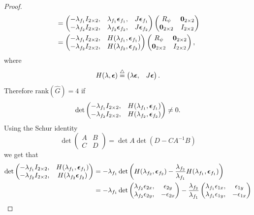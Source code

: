\begin{proof}
\begin{align*}
	&= \begin{pmatrix} -\lambda_{f_1} I_{2\times 2}, & \lambda_{f_1} \boldsymbol{\epsilon}_{f_1}, & J\boldsymbol{\epsilon}_{f_1} \\ -\lambda_{f_2} I_{2\times 2}, & \lambda_{f_2} \boldsymbol{\epsilon}_{f_2}, & J\boldsymbol{\epsilon}_{f_2} \end{pmatrix} \begin{pmatrix}R_\psi & \mathbf{0}_{2\times 2} \\ \mathbf{0}_{2\times 2} & I_{2\times 2}\end{pmatrix} \\
	&= \begin{pmatrix} -\lambda_{f_1} I_{2\times 2}, & H(\lambda_{f_1}, \boldsymbol{\epsilon}_{f_1}) \\ -\lambda_{f_2} I_{2\times 2}, & H(\lambda_{f_2}, \boldsymbol{\epsilon}_{f_2}) \end{pmatrix} \begin{pmatrix}R_\psi & \mathbf{0}_{2\times 2} \\ \mathbf{0}_{2\times 2} & I_{2\times 2}\end{pmatrix},	
	\end{align*}
	where 
	\[
	H(\lambda, \boldsymbol{\epsilon}) \stackrel{\triangle}{=} \begin{pmatrix} \lambda \boldsymbol{\epsilon}, & J\boldsymbol{\epsilon} \end{pmatrix}.
	\]
	Therefore $\text{rank}(\hat{G})=4$ if 
	\[
	\det{\begin{pmatrix} -\lambda_{f_1} I_{2\times 2}, & H(\lambda_{f_1}, \boldsymbol{\epsilon}_{f_1}) \\ -\lambda_{f_2} I_{2\times 2}, & H(\lambda_{f_2}, \boldsymbol{\epsilon}_{f_2}) \end{pmatrix}} \neq 0.
	\]
	Using the Schur identity 
	\[
	\det{\begin{pmatrix} A & B \\ C & D \end{pmatrix}} = \det{A}\det{(D-CA^{-1}B)}
	\]
	we get that
	\begin{align*}
	\det{\begin{pmatrix} -\lambda_{f_1} I_{2\times 2}, & H(\lambda_{f_1}, \epsilonbf_{f_1}) \\ -\lambda_{f_2} I_{2\times 2}, & H(\lambda_{f_2} \epsilonbf_{f_2}) \end{pmatrix}}
		&= -\lambda_{f_1} \det{\left(H(\lambda_{f_2},\epsilonbf_{f_2}) - \frac{\lambda_{f_2}}{\lambda_{f_1}}H(\lambda_{f_1},\epsilonbf_{f_1})\right)} \\
		&= -\lambda_{f_1} \det{\begin{pmatrix}\lambda_{f_2}\epsilon_{2x}, & \epsilon_{2y} \\ \lambda_{f_2}\epsilon_{2y}, & -\epsilon_{2x} \end{pmatrix}-\frac{\lambda_{f_2}}{\lambda_{f_1}}\begin{pmatrix}\lambda_{f_1}\epsilon_{1x}, & \epsilon_{1y} \\ \lambda_{f_1}\epsilon_{1y}, & -\epsilon_{1x}\end{pmatrix}} \\

\end{align*}
\end{proof}
